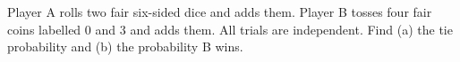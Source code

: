 Player A rolls two fair six-sided dice and adds them. Player B tosses four fair coins labelled $0$ and $3$ and adds them. All trials are independent. Find (a) the tie probability and (b) the probability B wins.

